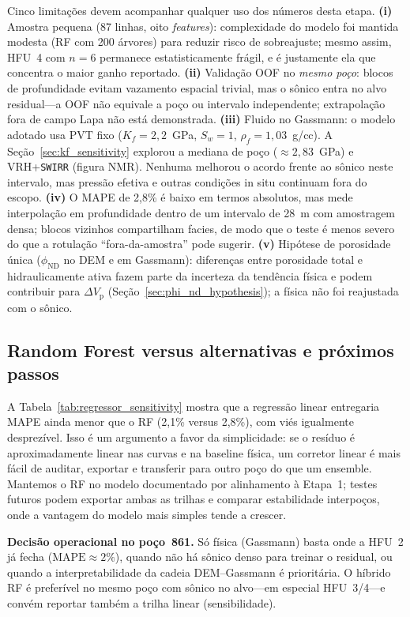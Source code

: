 \documentclass[11pt,a4paper]{article}
\numberwithin{equation}{section}
\newcommand{\phiND}{\ensuremath{\phi_{\mathrm{ND}}}}
\begin{document}
Cinco limitações devem acompanhar qualquer uso dos números desta etapa.
\textbf{(i)} Amostra pequena (87 linhas, oito \emph{features}): complexidade do
modelo foi mantida modesta (RF com 200 árvores) para reduzir risco de
sobreajuste; mesmo assim, HFU~4 com $n=6$ permanece estatisticamente frágil,
e é justamente ela que concentra o maior ganho reportado.
\textbf{(ii)} Validação OOF no \emph{mesmo poço}: blocos de profundidade
evitam vazamento espacial trivial, mas o sônico entra no alvo residual---a
OOF não equivale a poço ou intervalo independente; extrapolação fora
de campo Lapa não está demonstrada.
\textbf{(iii)} Fluido no Gassmann: o modelo adotado usa PVT fixo
($K_f=2{,}2$~GPa, $S_w=1$, $\rho_f=1{,}03$~g/cc).
A Seção~\ref{sec:kf_sensitivity} explorou a mediana de poço
($\approx 2{,}83$~GPa) e VRH+\texttt{SWIRR} (figura NMR).
Nenhuma melhorou o acordo frente ao sônico neste intervalo, mas pressão efetiva e
outras condições in situ continuam fora do escopo.
\textbf{(iv)} O MAPE de 2,8\% é baixo em termos absolutos, mas mede
interpolação em profundidade dentro de um intervalo de 28~m com amostragem
densa; blocos vizinhos compartilham facies, de modo que o teste é menos severo
do que a rotulação ``fora-da-amostra'' pode sugerir.
\textbf{(v)} Hipótese de porosidade única (\phiND{} no DEM e em Gassmann):
diferenças entre porosidade total e hidraulicamente ativa fazem parte da
incerteza da tendência física e podem contribuir para $\Delta V_{\mathrm{p}}$
(Seção~\ref{sec:phi_nd_hypothesis}); a física não foi reajustada com o sônico.

\subsection{Random Forest versus alternativas e próximos passos}
\label{sec:proximos_passos}

A Tabela~\ref{tab:regressor_sensitivity} mostra que a regressão linear
entregaria MAPE ainda menor que o RF (2,1\% versus 2,8\%), com viés
igualmente desprezível.
Isso é um argumento a favor da simplicidade: se o resíduo é aproximadamente
linear nas curvas e na baseline física, um corretor linear é mais fácil de
auditar, exportar e transferir para outro poço do que um ensemble.
Mantemos o RF no modelo documentado por alinhamento à Etapa~1; testes futuros
podem exportar ambas as trilhas e comparar estabilidade interpoços, onde a
vantagem do modelo mais simples tende a crescer.

\textbf{Decisão operacional no poço~861.}
Só física (Gassmann) basta onde a HFU~2 já fecha ($\mathrm{MAPE}\approx 2\%$),
quando não há sônico denso para treinar o residual, ou quando a
interpretabilidade da cadeia DEM--Gassmann é prioritária.
O híbrido RF é preferível no mesmo poço com sônico no alvo---em especial
HFU~3/4---e convém reportar também a trilha linear (sensibilidade).
\end{document}
